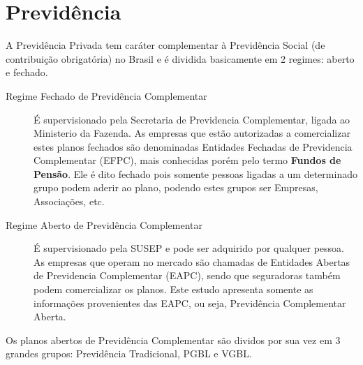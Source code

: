 \documentclass[../../relatorio.tex]{subfiles}
\begin{document}
\section{Previdência}

A Previdência Privada tem caráter complementar à Previdência Social (de contribuição obrigatória) no Brasil e é dividida basicamente em 2 regimes: aberto e fechado.

\begin{description}
  \item[Regime Fechado de Previdência Complementar] É supervisionado pela Secretaria de Previdencia Complementar, ligada ao Ministerio da Fazenda. As empresas que estão autorizadas a comercializar estes planos fechados são denominadas Entidades Fechadas de Previdencia Complementar (EFPC), mais conhecidas porém pelo termo \textbf{Fundos de Pensão}. Ele é dito fechado pois somente pessoas ligadas a um determinado grupo podem aderir ao plano, podendo estes grupos ser Empresas, Associações, etc.

  \item[Regime Aberto de Previdência Complementar] É supervisionado pela SUSEP e pode ser adquirido por qualquer pessoa. As empresas que operam no mercado são chamadas de Entidades Abertas de Previdencia Complementar (EAPC), sendo que seguradoras também podem comercializar os planos. Este estudo apresenta somente as informações provenientes das EAPC, ou seja, Previdência Complementar Aberta.
\end{description}

Os planos abertos de Previdência Complementar são dividos por sua vez em 3 grandes grupos: Previdência Tradicional, PGBL e VGBL.
\end{document}

